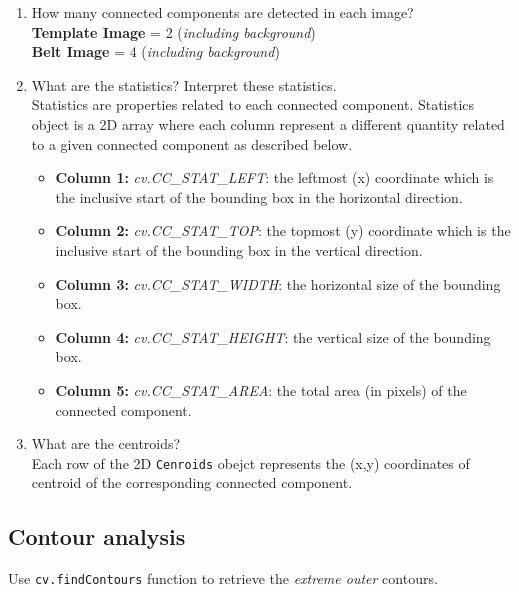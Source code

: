 \documentclass[a4paper,11pt]{article}%
\begin{document}
    \begin{enumerate}
\item
  How many connected components are detected in each image?\\
  \textbf{Template Image} = 2 (\emph{including background})\\ \textbf{Belt
  Image} = 4 (\emph{including background})
\item
  What are the statistics? Interpret these statistics. \\ Statistics are
  properties related to each connected component. Statistics object is a
  2D array where each column represent a different quantity related to a
  given connected component as described below.
  	\begin{itemize}
  		\item \textbf{Column 1:} \emph{cv.CC\_STAT\_LEFT}: the leftmost (x) coordinate
  		which is the inclusive start of the bounding box in the horizontal
  		direction.
  		\item \textbf{Column 2:} \emph{cv.CC\_STAT\_TOP}: the topmost (y)
  		coordinate which is the inclusive start of the bounding box in the
  		vertical direction.
  		\item \textbf{Column 3:} \emph{cv.CC\_STAT\_WIDTH}: the
  		horizontal size of the bounding box.
  		\item \textbf{Column 4:}
  		\emph{cv.CC\_STAT\_HEIGHT}: the vertical size of the bounding box.
  		\item \textbf{Column 5:} \emph{cv.CC\_STAT\_AREA}: the total area (in pixels)
  		of the connected component.
  	\end{itemize}

  \item
  What are the centroids?\\ Each row of the 2D \texttt{Cenroids} obejct
  represents the (x,y) coordinates of centroid of the corresponding
  connected component.
\end{enumerate}





    \hypertarget{contour-analysis}{%
\subsection{Contour analysis}\label{contour-analysis}}

Use \texttt{cv.findContours} function to retrieve the \emph{extreme outer}
contours.\\
\end{document}

